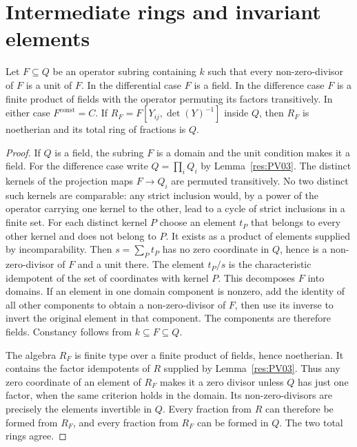 \section{Intermediate rings and invariant elements}

\begin{lemma}
\label{res:PV13}
Let \(F\subseteq Q\) be an operator subring containing \(k\)
such that every non-zero-divisor of \(F\) is a unit of \(F\).
In the differential case \(F\) is a field. In the difference
case \(F\) is a finite product of fields with the operator permuting
its factors transitively. In either case \(F^{\mathrm{const}}=C\).
If \(R_F=F[Y_{ij},\det(Y)^{-1}]\) inside \(Q\), then \(R_F\)
is noetherian and its total ring of fractions is \(Q\).
\end{lemma}

\begin{proof}
If \(Q\) is a field, the subring \(F\) is a domain and the
unit condition makes it a field. For the difference case write
\(Q=\prod_i Q_i\) by Lemma~\ref{res:PV03}. The distinct kernels
of the projection maps \(F\to Q_i\) are permuted transitively.
No two distinct such kernels are comparable: any strict inclusion
would, by a power of the operator carrying one kernel to the other,
lead to a cycle of strict inclusions in a finite set.
For each distinct kernel \(P\) choose an element \(t_P\) that
belongs to every other kernel and does not belong to \(P\).
It exists as a product of elements supplied by incomparability.
Then \(s=\sum_P t_P\) has no zero coordinate in \(Q\), hence
is a non-zero-divisor of \(F\) and a unit there. The element
\(t_P/s\) is the characteristic idempotent of the set of
coordinates with kernel \(P\). This decomposes \(F\) into domains.
If an element in one domain component is nonzero, add the
identity of all other components to obtain a non-zero-divisor
of \(F\), then use its inverse to invert the original element
in that component. The components are therefore fields.
Constancy follows from \(k\subseteq F\subseteq Q\).

The algebra \(R_F\) is finite type over a finite product of
fields, hence noetherian. It contains the factor idempotents
of \(R\) supplied by Lemma~\ref{res:PV03}. Thus any zero
coordinate of an element of \(R_F\) makes it a zero divisor
unless \(Q\) has just one factor, when the same criterion
holds in the domain. Its non-zero-divisors are precisely the
elements invertible in \(Q\). Every fraction from \(R\) can
therefore be formed from \(R_F\), and every fraction from \(R_F\)
can be formed in \(Q\). The two total rings agree.
\end{proof}

